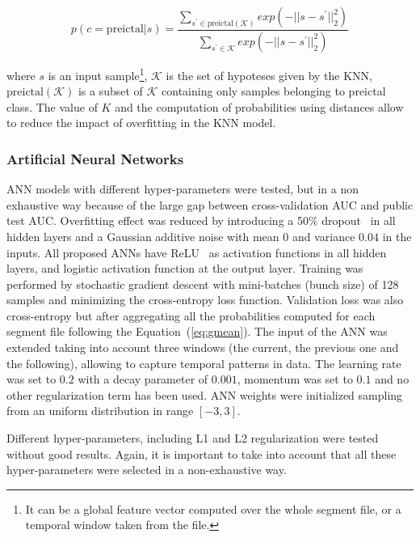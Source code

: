 \documentclass[a4paper,english,twoside]{article}
\begin{document}
\begin{equation}
p(c=\text{preictal} | s) =
\displaystyle{\frac{\displaystyle{\sum_{ s^\prime \in \text{preictal}(\mathcal{K}) } exp( -||s - s^\prime||^2_2 ) }}
{\displaystyle{\sum_{s^\prime \in \mathcal{K}} exp( -||s - s^\prime||^2_2 ) }}}
\end{equation}

\noindent where $s$ is an input sample\footnote{It can be a global feature
  vector computed over the whole segment file, or a temporal window taken from
  the file.}, $\mathcal{K}$ is the set of hypoteses given by the KNN,
$\text{preictal}(\mathcal{K})$ is a subset of $\mathcal{K}$ containing only
samples belonging to preictal class. The value of $K$ and the computation of
probabilities using distances allow to reduce the impact of overfitting in the
KNN model.

\subsubsection{Artificial Neural
  Networks}\label{artificial-neural-networks}

ANN models with different hyper-parameters were tested, but in a non exhaustive
way because of the large gap between cross-validation AUC and public test
AUC. Overfitting effect was reduced by introducing a 50\%
dropout~\cite{2012:arxiv:hinton:dropout} in all hidden layers and a Gaussian
additive noise with mean $0$ and variance $0.04$ in the inputs. All proposed
ANNs have ReLU~\cite{2011:glorot:aistats} as activation functions in all hidden
layers, and logistic activation function at the output layer. Training was
performed by stochastic gradient descent with mini-batches (bunch size) of 128
samples and minimizing the cross-entropy loss function. Validation loss was also
cross-entropy but after aggregating all the probabilities computed for each
segment file following the Equation~(\ref{eq:gmean}). The input of the ANN was
extended taking into account three windows (the current, the previous one and
the following), allowing to capture temporal patterns in data. The learning rate
was set to $0.2$ with a decay parameter of $0.001$, momentum was set to $0.1$
and no other regularization term has been used. ANN weights were initialized
sampling from an uniform distribution in range $[-3,3]$.

Different hyper-parameters, including L1 and L2 regularization were tested without
good results. Again, it is important to take into account that all these
hyper-parameters were selected in a non-exhaustive way.
\end{document}
